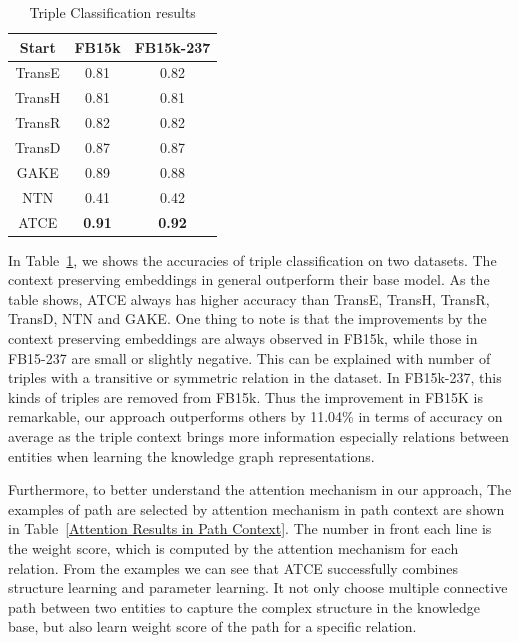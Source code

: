 \begin{table}
 \centering
 \caption{Triple Classification results}
  \label{Triple Classification_results}
\begin{tabular}{c|c|c}
  \hline
  Start & FB15k  & FB15k-237 \\
  \hline
  TransE & 0.81 & 0.82 \\
  TransH & 0.81 & 0.81 \\
  TransR & 0.82 & 0.82 \\
  TransD & 0.87 & 0.87 \\
  GAKE & 0.89 & 0.88 \\
  NTN & 0.41 & 0.42 \\
  \hline
  ATCE & \textbf{0.91} & \textbf{0.92} \\
  \hline
\end{tabular}
\end{table}
In Table~\ref{Triple Classification_results}, we shows the accuracies of triple classification on two datasets. The context preserving embeddings in general outperform their base model. As the table shows, ATCE always has higher accuracy than TransE, TransH, TransR, TransD, NTN and GAKE. One thing to note is that the improvements by the context preserving embeddings are always observed in FB15k, while those in FB15-237 are small or slightly negative. This can be explained with number of triples with a transitive or symmetric relation in the dataset. In FB15k-237, this kinds of triples are removed from FB15k. Thus the improvement in FB15K is remarkable, our approach outperforms others by 11.04\% in terms of accuracy on average as the triple context brings more information especially relations between entities when learning the knowledge graph representations.

Furthermore, to better understand the attention mechanism in our approach, The examples of path are selected by attention mechanism in path context are shown in Table~\ref{Attention Results in Path Context}. The number in front each line is the weight score, which is computed by the attention mechanism for each relation. From the examples we can see that ATCE successfully combines structure learning and parameter learning. It not only choose multiple connective path between two entities to capture the complex structure in the knowledge base, but also learn weight score of the path for a specific relation.


